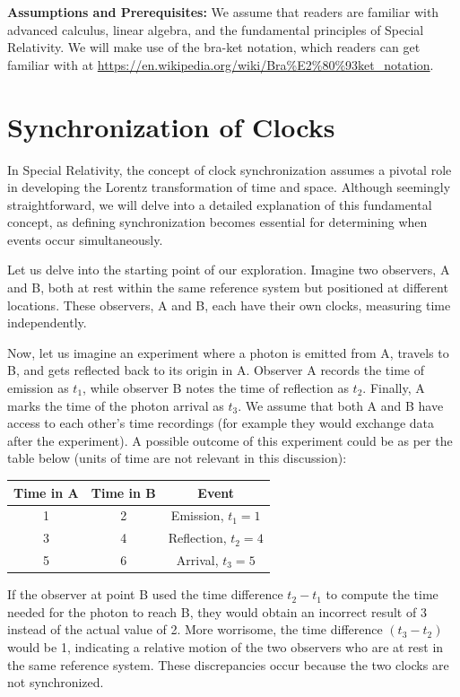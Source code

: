 \documentclass[12pt]{article}
\begin{document}
\textbf{Assumptions and Prerequisites:} We assume that readers are familiar with advanced
calculus, linear algebra, and the fundamental principles of Special Relativity. We will make
use of the bra-ket notation, which readers can get familiar with at
\url{https://en.wikipedia.org/wiki/Bra\%E2\%80\%93ket_notation}.

\section{Synchronization of Clocks}

In Special Relativity, the concept of clock synchronization assumes a pivotal role in
developing the Lorentz transformation of time and space. Although seemingly straightforward,
we will delve into a detailed explanation of this fundamental concept, as defining
synchronization becomes essential for determining when events occur simultaneously.

Let us delve into the starting point of our exploration. Imagine two observers, A and B, both
at rest within the same reference system but positioned at different locations. These
observers, A and B, each have their own clocks, measuring time independently.

Now, let us imagine an experiment where a photon is emitted from A, travels to B, and gets
reflected back to its origin in A. Observer A records the time of emission as $t_1$, while
observer B notes the time of reflection as $t_2$. Finally, A marks the time of the photon
arrival as $t_3$. We assume that both A and B have access to each other's time recordings
(for example they would exchange data after the experiment). A possible outcome of this
experiment could be as per the table below (units of time are not relevant in this
discussion):

\begin{center}
\begin{tabular}{ccc}
\toprule
Time in A & Time in B & Event \\
\midrule
1 & 2 & Emission, $t_1 = 1$ \\
3 & 4 & Reflection, $t_2 = 4$ \\
5 & 6 & Arrival, $t_3 = 5$ \\
\bottomrule
\end{tabular}
\end{center}

If the observer at point B used the time difference $t_2 - t_1$ to compute the time needed
for the photon to reach B, they would obtain an incorrect result of 3 instead of the actual
value of 2. More worrisome, the time difference $(t_3 - t_2)$ would be 1, indicating a
relative motion of the two observers who are at rest in the same reference system. These
discrepancies occur because the two clocks are not synchronized.
\end{document}
